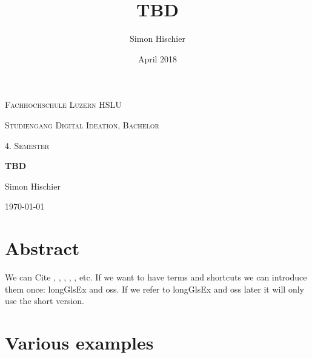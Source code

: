 \documentclass[10pt]{article}
\title{TBD}
\author{Simon Hischier}
\date{April 2018}
\begin{document}
\begin{titlepage}
\centering
\vspace{1cm}
	{\scshape\LARGE Fachhochschule Luzern HSLU \par}
	\vspace{1cm}
	{\scshape\Large Studiengang Digital Ideation, Bachelor \par}
	
	{\scshape\Large 4. Semester\par}
	\vspace{1.5cm}
	{\huge\bf TBD\par}
	
	\vspace{10cm}
	{\Large Simon Hischier\par}
	\vfill

	{\large \today\par}
\end{titlepage}

\renewcommand{\contentsname}{Inhalt}
\tableofcontents
\newpage

\section{Abstract}
We can Cite \cite{wikipediaScriptingLanguage}, \cite{Iivari2008usabilityInCompanyOSS}, \cite{almarzouq2005open}, \cite{heiseonline2017limuxservus}, \cite{viorres2007major}, \cite{wikipediaScriptingLanguage} etc. If we want to have terms and shortcuts we can introduce them once: \gls{longGlsEx} and \gls{oss}. If we refer to \gls{longGlsEx} and \gls{oss} later it will only use the short version.

\section{Various examples}
\end{document}
